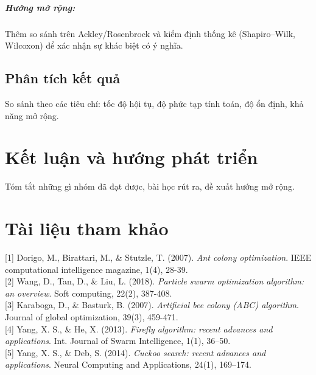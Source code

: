 \documentclass[a4paper]{report}
\begin{document}
\paragraph{Hướng mở rộng:} Thêm so sánh trên Ackley/Rosenbrock và kiểm định thống kê (Shapiro–Wilk, Wilcoxon) để xác nhận sự khác biệt có ý nghĩa.

\section{Phân tích kết quả}
So sánh theo các tiêu chí: tốc độ hội tụ, độ phức tạp tính toán, độ ổn định, khả năng mở rộng.

\chapter{Kết luận và hướng phát triển}
Tóm tắt những gì nhóm đã đạt được, bài học rút ra, đề xuất hướng mở rộng.

\chapter*{Tài liệu tham khảo}
{[1]} Dorigo, M., Birattari, M., \& Stutzle, T. (2007). \textit{Ant colony optimization}. IEEE computational intelligence magazine, 1(4), 28-39.\\
{[2]} Wang, D., Tan, D., \& Liu, L. (2018). \textit{Particle swarm optimization algorithm: an overview}. Soft computing, 22(2), 387-408.\\
{[3]} Karaboga, D., \& Basturk, B. (2007). \textit{Artificial bee colony (ABC) algorithm}. Journal of global optimization, 39(3), 459-471.\\
{[4]} Yang, X. S., \& He, X. (2013). \textit{Firefly algorithm: recent advances and applications}. Int. Journal of Swarm Intelligence, 1(1), 36–50.\\
{[5]} Yang, X. S., \& Deb, S. (2014). \textit{Cuckoo search: recent advances and applications}. Neural Computing and Applications, 24(1), 169–174.\\
\end{document}
